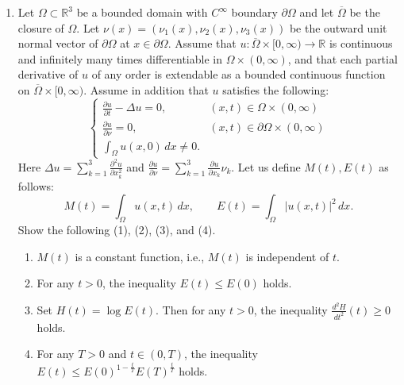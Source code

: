 \documentclass{article}
\begin{document}
\begin{enumerate}[label=\fbox{\arabic*}]
\begin{enumerate}[label=(\arabic*)]
                (*) For every $f \in H^\infty(\mathbb{D})$ and $z \in \mathbb{D}$, we have
                \[
                  (T_r f)(z) = \int_0^r \int_0^{2\pi} k(t, \theta, z) f(se^{i\theta}) \, d\theta dt.
                \]
                Here $i$ denotes the imaginary unit.
          \item Show that $T_1$ is a compact operator.
        \end{enumerate}

  \item Let $\Omega \subset \mathbb{R}^3$ be a bounded domain with $C^\infty$ boundary $\partial\Omega$ and let $\overline{\Omega}$ be the closure of $\Omega$. Let $\nu(x) = (\nu_1(x), \nu_2(x), \nu_3(x))$ be the outward unit normal vector of $\partial\Omega$ at $x \in \partial\Omega$. Assume that $u: \overline{\Omega} \times [0, \infty) \to \mathbb{R}$ is continuous and infinitely many times differentiable in $\Omega \times (0, \infty)$, and that each partial derivative of $u$ of any order is extendable as a bounded continuous function on $\overline{\Omega} \times [0, \infty)$. Assume in addition that $u$ satisfies the following:
        \[
          \begin{cases}
            \frac{\partial u}{\partial t} - \Delta u = 0, & (x, t) \in \Omega \times (0, \infty) \\
            \frac{\partial u}{\partial \nu} = 0, & (x, t) \in \partial\Omega \times (0, \infty) \\
            \int_\Omega u(x, 0) \, dx \neq 0. & 
          \end{cases}
        \]
        Here $\Delta u = \sum_{k=1}^3 \frac{\partial^2 u}{\partial x_k^2}$ and $\frac{\partial u}{\partial \nu} = \sum_{k=1}^3 \frac{\partial u}{\partial x_k} \nu_k$. Let us define $M(t), E(t)$ as follows:
        \[
          M(t) = \int_\Omega u(x, t) \, dx, \qquad E(t) = \int_\Omega |u(x, t)|^2 \, dx.
        \]
        Show the following (1), (2), (3), and (4).
        \begin{enumerate}[label=(\arabic*)]
          \item $M(t)$ is a constant function, i.e., $M(t)$ is independent of $t$.
          \item For any $t > 0$, the inequality $E(t) \le E(0)$ holds.
          \item Set $H(t) = \log E(t)$. Then for any $t > 0$, the inequality $\frac{d^2 H}{dt^2}(t) \ge 0$ holds.
          \item For any $T > 0$ and $t \in (0, T)$, the inequality $E(t) \le E(0)^{1 - \frac{t}{T}} E(T)^{\frac{t}{T}}$ holds.
        \end{enumerate}


\end{enumerate}
\end{document}
